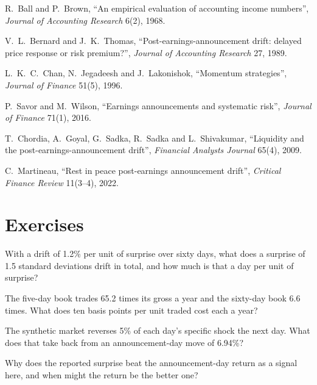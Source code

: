 \begin{omsources}
\item R.~Ball and P.~Brown, ``An empirical evaluation of accounting income numbers'', \emph{Journal of Accounting Research} 6(2), 1968.
\item V.~L.~Bernard and J.~K.~Thomas, ``Post-earnings-announcement drift: delayed price response or risk premium?'', \emph{Journal of Accounting Research}
27, 1989.
\item L.~K.~C.~Chan, N.~Jegadeesh and J.~Lakonishok, ``Momentum strategies'', \emph{Journal of Finance} 51(5), 1996.
\item P.~Savor and M.~Wilson, ``Earnings announcements and systematic risk'', \emph{Journal of Finance} 71(1), 2016.
\item T.~Chordia, A.~Goyal, G.~Sadka, R.~Sadka and L.~Shivakumar, ``Liquidity and the post-earnings-announcement drift'', \emph{Financial Analysts
Journal} 65(4), 2009.
\item C.~Martineau, ``Rest in peace post-earnings announcement drift'', \emph{Critical Finance Review} 11(3--4), 2022.
\end{omsources}

\section{Exercises}

\begin{exercise}[$\star$]\label{exo:s1:earnings:1}
With a drift of 1.2\% per unit of surprise over sixty days, what does a surprise of 1.5 standard deviations drift in total, and how much is that a day per
unit of surprise?
\end{exercise}

\begin{exercise}[$\star$]\label{exo:s1:earnings:2}
The five-day book trades 65.2 times its gross a year and the sixty-day book 6.6 times. What does ten basis points per unit traded cost each a year?
\end{exercise}

\begin{exercise}[$\star$]\label{exo:s1:earnings:3}
The synthetic market reverses 5\% of each day's specific shock the next day. What does that take back from an announcement-day move of 6.94\%?
\end{exercise}

\begin{exercise}[$\star\star$]\label{exo:s1:earnings:4}
Why does the reported surprise beat the announcement-day return as a signal here, and when might the return be the better one?
\end{exercise}


